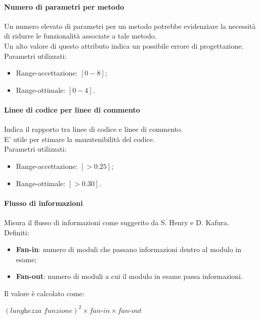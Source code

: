 \paragraph{Numero di parametri per metodo}
Un numero elevato di parametri per un metodo potrebbe evidenziare la necessità di ridurre le funzionalità associate a tale metodo.\\
Un alto valore di questo attributo indica un possibile errore di progettazione.\\
Parametri utilizzati:
\begin{itemize}
\item Range-accettazione: $[0-8]$;
\item Range-ottimale: $[0-4]$.
\end{itemize}

\paragraph{Linee di codice per linee di commento}
Indica il rapporto tra linee di codice e linee di commento.\\
E' utile per stimare la manutenibilità del codice.\\
Parametri utilizzati:
\begin{itemize}
\item Range-accettazione: $[>0.25]$;
\item Range-ottimale: $[>0.30]$.
\end{itemize}

\paragraph{Flusso di informazioni}
Misura il flusso di informazioni come suggerito da S. Henry e D. Kafura.\\
Definiti:
\begin{itemize}
\item \textbf{Fan-in}: numero di moduli che passano informazioni dentro al modulo in esame;
\item \textbf{Fan-out}: numero di moduli a cui il modulo in esame passa informazioni.
\end{itemize}
Il valore è calcolato come:
\begin{center}
$(\textit{lunghezza funzione})^2\times\textit{fan-in}\times\textit{fan-out}$
\end{center}

